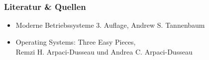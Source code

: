 \section*{}
\begin{frame}
	\frametitle{Literatur \& Quellen}
	\begin{itemize}
		\item Moderne Betriebssysteme 3. Auflage, Andrew S. Tannenbaum
		\item Operating Systems: Three Easy Pieces,\\ Remzi H. Arpaci-Dusseau und Andrea C. Arpaci-Dusseau 
	\end{itemize}
\end{frame}